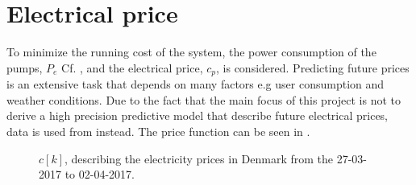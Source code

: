 \chapter{Electrical price}\label{sec:cost_fkt} %
%
%
To minimize the running cost of the system, the power consumption of the pumps, $P_e$ Cf. , and the electrical price, $c_p$, is considered. Predicting future prices is an extensive task that depends on many factors e.g user consumption and weather conditions. Due to the fact that the main focus of this project is not to derive a high precision predictive model that describe future electrical prices, data is used from \cite{Electrical_price} instead. The price function can be seen in . 





	


\begin{figure}[H]
\centering

\caption{$c[k]$, describing the electricity prices in Denmark from the 27-03-2017 to 02-04-2017.}
\label{fig:electrical_price} 
\end{figure}

